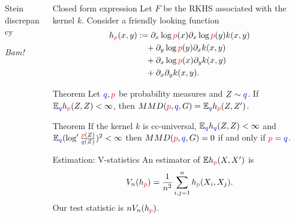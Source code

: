 \begin{frame}
\begin{columns}
\begin{column}{.33\linewidth}
\begin{block}{Stein discrepancy}
\vspace{1cm}
\begin{center}
\emph{Bam!}
\end{center}
\end{block}
\end{column}

\hspace{-1.45cm}
\begin{column}{.33\linewidth}

\vspace{-0.75cm}
\begin{block}{Closed form expression}
 Let $F$ be the RKHS associated with the kernel $k$. Consider a friendly looking function
\begin{align*}
h_{{\color{red} p}}(x,y) & := \partial_{x} \log {\color{red} p}(x) \partial_{x} \log {\color{red} p}(y) k(x,y)\\
 & \quad+\partial_{y} \log {\color{red} p}(y) \partial_{x}  k(x,y)\\
 & \quad+\partial_{x} \log {\color{red} p}(x) \partial_{y}k(x,y)\\
 & \quad+\partial_{x} \partial_{y} k(x,y).
\end{align*}
 
\end{block}

\vspace{-0.75cm}
\begin{block}{Theorem}
Let ${ \color{blue} q},{\color{red} p}$ be probability measures and $Z\sim { \color{blue} q}$. 
If $\mathbb{E}_{{ \color{blue} q}} h_{{\color{red} p}}(Z,Z)<\infty$, then $MMD({\color{red} p},{ \color{blue} q},G) = \mathbb{E}_{{ \color{blue} q}} h_{{\color{red} p}}(Z,Z')$.
\end{block}
\vspace{-0.75cm}
\begin{block}{Theorem}
 If the kernel $k$ is cc-universal, $\mathbb{E}_{{ \color{blue} q}} h_{{ \color{blue} q}}(Z,Z)<\infty$ and $\mathbb{E}_{{ \color{blue} q}} (\log' \frac{{\color{red} p}(Z)}{{ \color{blue} q}(Z)})^{2}<\infty$
then $MMD({\color{red} p},{ \color{blue} q},G) =0$ if and only if ${\color{red} p}={ \color{blue} q}$.

\end{block}
\vspace{-0.75cm}
\begin{block}{Estimation: V-statistics}
An estimator of $\mathbb{E} h_{\color{red} p}(X,X')$ is
\begin{align*}
 V_n(h_{\color{red} p}) = \frac {1} {n^2} \sum_{i,j=1}^n h_{\color{red} p}(X_i,X_j).
\end{align*}
Our test statistic is $ n V_n(h_{\color{red} p})$.


\end{block}
\end{column}
\end{columns}
\end{frame}

